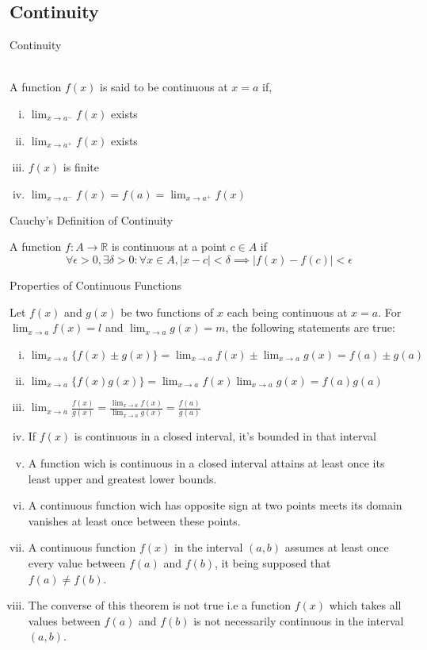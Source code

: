 
\subsection{Continuity}
\begin{definition}{Continuity}
    
    \\ A function $f(x)$ is said to be continuous at $x=a$ if,
    \begin{enumerate}[(i)]
        \item $\lim_{x \to a^-} f(x)$ exists
        \item $\lim_{x \to a^+} f(x)$ exists
        \item $f(x)$ is finite
        \item $\lim_{x \to a^-} f(x) = f(a) = \lim_{x \to a^+} f(x)$
    \end{enumerate}
\end{definition}

\begin{definition}{Cauchy's Definition of Continuity}
    
    A function $f:A \to \mathbb{R}$ is continuous at a point $c\in A$ if \[
        \forall \epsilon>0, \exists\delta>0 : \forall x\in A, |x-c|<\delta \implies |f(x)-f(c)|<\epsilon
    \]
\end{definition}

\begin{theorem}{Properties of Continuous Functions}
    
    Let $f(x)$ and $g(x)$ be two functions of $x$ each being continuous at $x=a$. For $\lim_{x \to a} f(x) = l$ and $\lim_{x \to a} g(x) = m$, the following statements are true:
    \begin{enumerate}[(i)]
        \item $ \lim_{x \to a} \{ f(x)\pm g(x) \} = \lim_{x \to a} f(x) \pm \lim_{x \to a} g(x) = f(a)\pm g(a) $
        \item $ \lim_{x \to a} \{ f(x)g(x) \} = \lim_{x \to a} f(x)\lim_{x \to a} g(x) = f(a)g(a) $
        \item $ \lim_{x \to a} \frac{f(x)}{g(x)} = \frac{\lim_{x \to a} f(x)}{\lim_{x \to a} g(x)} = \frac{f(a)}{g(a)} $
        \item If $f(x)$ is continuous in a closed interval, it's bounded in that interval
        \item A function wich is continuous in a closed interval attains at least once its least upper and greatest lower bounds.
        \item A continuous function wich has opposite sign at two points meets its domain vanishes at least once between these points.
        \item A continuous function $f(x)$ in the interval $(a,b)$ assumes at least once every value between $f(a)$ and $f(b)$, it being supposed that $f(a) \neq f(b)$.
        \item The converse of this theorem is not true i.e a function $f(x)$ which takes all values between $f(a)$ and $f(b)$ is not necessarily continuous in the interval $(a,b)$.
    \end{enumerate}
\end{theorem}

